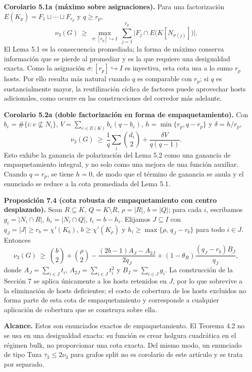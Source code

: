 \documentclass[
  spanish,
  11pt,
  a4paper,
]{article}
\begin{document}
\textbf{Corolario 5.1a (máximo sobre asignaciones).} Para una factorización \(E(K_p)=F_1\sqcup\cdots\sqcup F_{r_p}\) y \(q\ge r_p\), \[
\nu_3(G)\ \ge\ \max_{\sigma:[r_p]\hookrightarrow I}\ \sum_{j=1}^{r_p}\big|F_j\cap E\big(K[N_{\sigma(j)}]\big)\big|.
\] El Lema 5.1 es la consecuencia promediada; la forma de máximo conserva información que se pierde al promediar y es la que requiere una desigualdad exacta. Como la asignación \(\sigma:[r_p]\hookrightarrow I\) es inyectiva, esta cota usa a lo sumo \(r_p\) hosts. Por ello resulta más natural cuando \(q\) es comparable con \(r_p\); si \(q\) es sustancialmente mayor, la reutilización cíclica de factores puede aprovechar hosts adicionales, como ocurre en las construcciones del corredor más adelante.

\textbf{Corolario 5.2a (doble factorización en forma de empaquetamiento).} Con \(b_e=\#\{i:e\not\subseteq N_i\}\), \(V=\sum_{e\in E(K)} b_e(q-b_e)\), \(h=\min\{r_p,q-r_p\}\) y \(\delta=h/r_p\), \[
\nu_3(G)\ \ge\ \frac1q\sum_i\binom{d_i}{2}+\frac{\delta V}{q(q-1)}.
\] Esto exhibe la ganancia de polarización del Lema 5.2 como una ganancia de empaquetamiento integral, y no solo como una mejora de una función auxiliar. Cuando \(q=r_p\), se tiene \(h=0\), de modo que el término de ganancia se anula y el enunciado se reduce a la cota promediada del Lema 5.1.

\textbf{Proposición 7.4 (cota robusta de empaquetamiento con centro desplazado).} Sean \(R\subseteq K\), \(Q=K\setminus R\), \(\rho=|R|\), \(b=|Q|\); para cada \(i\), escribamos \(g_i=|N_i\cap R|\), \(h_i=|N_i\cap Q|\), \(t_i=b-h_i\). Elijamos \(J\subseteq I\) con \(q_J=|J|\ge r_b=\chi'(K_b)\), \(b\ge\chi'(K_\rho)\) y \(h_i\ge\max\{\rho,\,q_J-r_b\}\) para todo \(i\in J\). Entonces \[
\nu_3(G)\ \ge\ \binom b2+\binom\rho2-\frac{(2b-1)A_J-A_{2J}}{2q_J}+(1-\theta_R)\frac{(q_J-r_b)B_J}{q_J},
\] donde \(A_J=\sum_{i\in J}t_i\), \(A_{2J}=\sum_{i\in J}t_i^2\) y \(B_J=\sum_{i\in J}g_i\). La construcción de la Sección 7 se aplica únicamente a los hosts retenidos en \(J\), por lo que sobrevive a la eliminación de hosts deficientes; el costo de cobertura de los hosts excluidos no forma parte de esta cota de empaquetamiento y corresponde a cualquier aplicación de cobertura que se construya sobre ella.

\textbf{Alcance.} Estos son enunciados exactos de empaquetamiento. El Teorema 4.2 no se usa en una desigualdad exacta: su función es crear holgura cuadrática en el régimen bulk, no proporcionar una cota exacta. Del mismo modo, un enunciado de tipo Tuza \(\tau_3\le2\nu_3\) para grafos split no es corolario de este artículo y se trata por separado.
\end{document}
